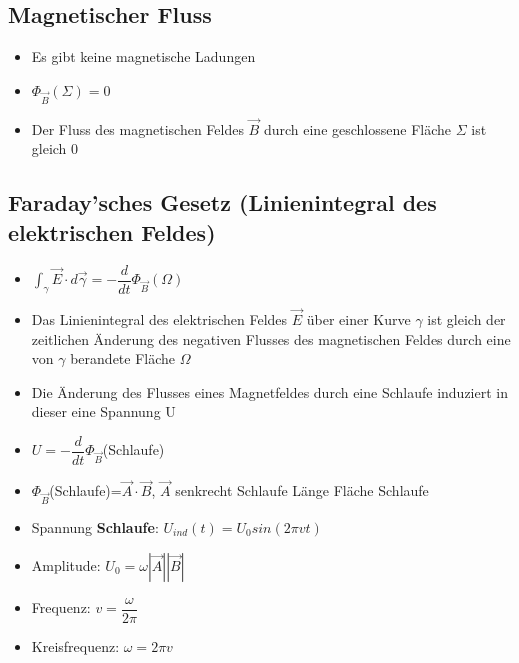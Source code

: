\documentclass[8pt,a4paper]{scrartcl}
\begin{document}
\begin{multicols*}{3}
				\subsection{Magnetischer Fluss}
					\begin{itemize}\itemsep0pt
						\item Es gibt keine magnetische Ladungen
						\item $\Phi_{\overrightarrow{B}}(\Sigma) =0$
						\item Der Fluss des magnetischen Feldes $\overrightarrow{B}$ durch eine geschlossene Fläche $\Sigma$ ist gleich 0
					\end{itemize}	
				\subsection{Faraday'sches Gesetz (Linienintegral des elektrischen Feldes)}
					\begin{itemize}\itemsep0pt
						\item $\int_{\gamma} \overrightarrow{E} \cdot d \overrightarrow{\gamma} = - \dfrac{d}{dt} \Phi_{\overrightarrow{B}}(\Omega)$
						\item Das Linienintegral des elektrischen Feldes $\overrightarrow{E}$ über einer Kurve $\gamma$ ist gleich der zeitlichen Änderung des negativen Flusses des magnetischen Feldes durch eine von $\gamma$ berandete Fläche $\Omega$
						\item Die Änderung des Flusses eines Magnetfeldes durch eine Schlaufe induziert in dieser eine Spannung U
						\item $U=-\dfrac{d}{dt}\Phi_{\overrightarrow{B}}$(Schlaufe)
						\item $\Phi_{\overrightarrow{B}}$(Schlaufe)=$\overrightarrow{A}\cdot \overrightarrow{B}$, $\overrightarrow{A}$ senkrecht Schlaufe Länge Fläche Schlaufe
						\item Spannung \textbf{Schlaufe}: $U_{ind}(t) = U_{0}sin(2\pi vt)$
						\item Amplitude: $U_{0} = \omega |\overrightarrow{A}||\overrightarrow{B}|$
						\item Frequenz: $v = \dfrac{\omega}{2\pi}$
						\item Kreisfrequenz: $\omega = 2\pi v$
					\end{itemize}	

\end{multicols*}
\end{document}
